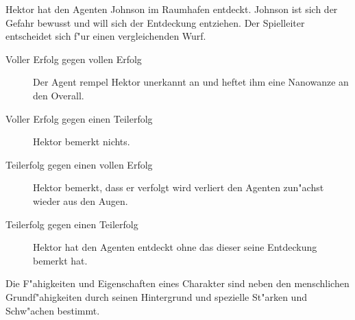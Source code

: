 \begin{ruleexample}
    Hektor hat den Agenten Johnson im Raumhafen entdeckt. Johnson ist sich der Gefahr bewusst und will sich der Entdeckung entziehen. Der Spielleiter entscheidet sich f"ur einen vergleichenden Wurf.

    \begin{description}
        \item[Voller Erfolg gegen vollen Erfolg] Der Agent rempel Hektor unerkannt an und heftet ihm eine Nanowanze an den Overall.
        \item[Voller Erfolg gegen einen Teilerfolg] Hektor bemerkt nichts.
        \item[Teilerfolg gegen einen vollen Erfolg] Hektor bemerkt, dass er verfolgt wird verliert den Agenten zun"achst wieder aus den     
            Augen.
        \item[Teilerfolg gegen einen Teilerfolg] Hektor hat den Agenten entdeckt ohne das dieser seine Entdeckung bemerkt hat.
    \end{description}
\end{ruleexample}



Die F"ahigkeiten und Eigenschaften eines Charakter sind neben den menschlichen Grundf"ahigkeiten durch seinen Hintergrund und spezielle St"arken und Schw"achen bestimmt. 

